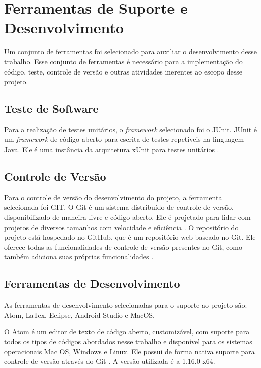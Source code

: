 \section{Ferramentas de Suporte e Desenvolvimento}
\label{sec:tecsuportedesenvolvimento}

Um conjunto de ferramentas foi selecionado para auxiliar o desenvolvimento desse trabalho. Esse conjunto de ferramentas é necessário para a implementação do código, teste, controle de versão e outras atividades inerentes ao escopo desse projeto.

    \subsection{Teste de Software}

Para a realização de testes unitários, o \textit{framework} selecionado foi o JUnit. JUnit é um \textit{framework} de código aberto para escrita de testes repetíveis na linguagem Java. Ele é uma instância da arquitetura xUnit para testes unitários \cite{junit2015}.

    \subsection{Controle de Versão}

Para o controle de versão do desenvolvimento do projeto, a ferramenta selecionada foi GIT. O Git é um sistema distribuído de controle de versão, disponibilizado de maneira livre e código aberto. Ele é projetado para lidar com projetos de diversos tamanhos com velocidade e eficiência \cite{git}. O repositório do projeto está hospedado no GitHub, que é um repositório web baseado no Git. Ele oferece todas as funcionalidades de controle de versão presentes no Git, como também adiciona suas próprias funcionalidades \cite{gitHub}.

    \subsection{Ferramentas de Desenvolvimento}
    \label{sec:tecferramentasdesenvolvimento}

As ferramentas de desenvolvimento selecionadas para o suporte ao projeto são: Atom, LaTex, Eclipse, Android Studio e MacOS.

O Atom é um editor de texto de código aberto, customizável, com suporte para todos
os tipos de códigos abordados nesse trabalho e disponível para os sistemas
operacionais Mac OS, Windows e Linux. Ele possui de forma nativa suporte para
controle de versão através do Git \cite{atom}. A versão utilizada é a 1.16.0 x64.

